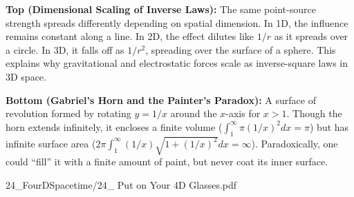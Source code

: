 \begin{SideNotePage}{
  \textbf{Top (Dimensional Scaling of Inverse Laws):}  
  The same point-source strength spreads differently depending on spatial dimension. In 1D, the influence remains constant along a line. In 2D, the effect dilutes like $1/r$ as it spreads over a circle. In 3D, it falls off as $1/r^2$, spreading over the surface of a sphere. This explains why gravitational and electrostatic forces scale as inverse-square laws in 3D space. \par

  \textbf{Bottom (Gabriel’s Horn and the Painter’s Paradox):}  
  A surface of revolution formed by rotating $y = 1/x$ around the $x$-axis for $x > 1$. Though the horn extends infinitely, it encloses a finite volume ($\int_1^\infty \pi (1/x)^2 dx = \pi$) but has infinite surface area ($2\pi \int_1^\infty (1/x) \sqrt{1 + (1/x)^2} dx = \infty$). Paradoxically, one could “fill” it with a finite amount of paint, but never coat its inner surface. \par

}{24_FourDSpacetime/24_ Put on Your 4D Glasses.pdf}
\end{SideNotePage}
